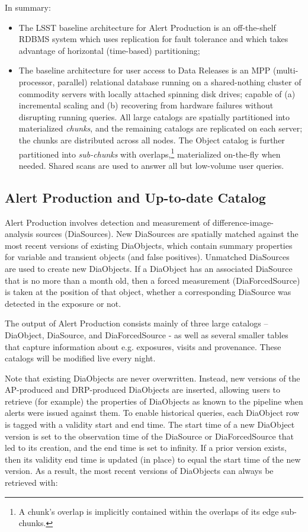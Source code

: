 \documentclass[DM,lsstdraft,toc]{lsstdoc}
\begin{document}
In summary:

\begin{itemize}
\item
  The LSST baseline architecture for Alert Production is an off-the-shelf
  RDBMS system which uses replication for fault tolerance and which takes
  advantage of horizontal (time-based) partitioning;
\item
  The baseline architecture for user access to Data Releases is an MPP
  (multi-processor, parallel) relational database running on a
  shared-nothing cluster of commodity servers with locally attached
  spinning disk drives; capable of (a) incremental scaling and (b)
  recovering from hardware failures without disrupting running queries.
  All large catalogs are spatially partitioned into materialized
  \emph{chunks}, and the remaining catalogs are replicated on each server;
  the chunks are distributed across all nodes. The Object catalog is
  further partitioned into \emph{sub-chunks} with overlaps,\footnote{A
  chunk's overlap is implicitly contained within the overlaps of its
  edge sub-chunks.} materialized on-the-fly when needed. Shared scans
  are used to answer all but low-volume user queries.
\end {itemize}

\subsection{Alert Production and Up-to-date Catalog}\label{alert-production-and-up-to-date-catalog}

Alert Production involves detection and measurement of difference-image-
analysis sources (DiaSources). New DiaSources are spatially matched against
the most recent versions of existing DiaObjects, which contain summary
properties for variable and transient objects (and false positives). Unmatched
DiaSources are used to create new DiaObjects. If a DiaObject has an associated
DiaSource that is no more than a month old, then a forced measurement
(DiaForcedSource) is taken at the position of that object, whether a
corresponding DiaSource was detected in the exposure or not.

The output of Alert Production consists mainly of three large catalogs --
DiaObject, DiaSource, and DiaForcedSource - as well as several smaller tables
that capture information about e.g. exposures, visits and provenance.
These catalogs will be modified live every night.

Note that existing DiaObjects are never overwritten. Instead, new versions of
the AP-produced and DRP-produced DiaObjects are inserted, allowing users to
retrieve (for example) the properties of DiaObjects as known to the pipeline
when alerts were issued against them. To enable historical queries, each
DiaObject row is tagged with a validity start and end time. The start time of
a new DiaObject version is set to the observation time of the DiaSource or
DiaForcedSource that led to its creation, and the end time is set to infinity.
If a prior version exists, then its validity end time is updated (in place) to
equal the start time of the new version. As a result, the most recent versions
of DiaObjects can always be retrieved with:
\end{document}

